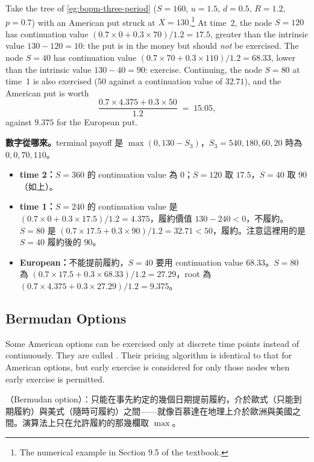 \begin{eg}
	\label{eg:american-put}
	Take the tree of \autoref{eg:bopm-three-period} ($S=160$, $u=1.5$, $d=0.5$, $R=1.2$, $p=0.7$) with an American put struck at $X=130$.\footnote{The numerical example in Section 9.5 of the textbook.}
	At time~2, the node $S=120$ has continuation value $(0.7\times0+0.3\times70)/1.2=17.5$, greater than the intrinsic value $130-120=10$: the put is in the money but should \emph{not} be exercised.
	The node $S=40$ has continuation value $(0.7\times70+0.3\times110)/1.2=68.33$, lower than the intrinsic value $130-40=90$: exercise.
	Continuing, the node $S=80$ at time~1 is also exercised ($50$ against a continuation value of $32.71$), and the American put is worth
	\[
		\frac{0.7\times4.375+0.3\times50}{1.2} \;=\; 15.05 ,
	\]
	against $9.375$ for the European put.

\begin{remark}
	\textbf{數字從哪來。}terminal payoff 是 $\max(0,130-S_{3})$，$S_{3}=540,180,60,20$ 時為 $0,0,70,110$。
	\begin{itemize}[nosep]
		\item \textbf{time 2：}$S=360$ 的 continuation value 為 $0$；$S=120$ 取 $17.5$，$S=40$ 取 $90$（如上）。
		\item \textbf{time 1：}$S=240$ 的 continuation value 是 $(0.7\times0+0.3\times17.5)/1.2=4.375$，履約價值 $130-240<0$，不履約。$S=80$ 是 $(0.7\times17.5+0.3\times90)/1.2=32.71<50$，履約。注意這裡用的是 $S=40$ 履約後的 $90$。
		\item \textbf{European：}不能提前履約，$S=40$ 要用 continuation value $68.33$。$S=80$ 為 $(0.7\times17.5+0.3\times68.33)/1.2=27.29$，root 為 $(0.7\times4.375+0.3\times27.29)/1.2=9.375$。
	\end{itemize}
\end{remark}
\end{eg}
\suppend

\subsection{Bermudan Options}


Some American options can be exercised only at discrete time points instead of continuously.
They are called .
Their pricing algorithm is identical to that for American options, but early exercise is considered for only those nodes when early exercise is permitted.

\suppstart
\begin{remark}
	（Bermudan option）：只能在事先約定的幾個日期提前履約，介於歐式（只能到期履約）與美式（隨時可履約）之間——就像百慕達在地理上介於歐洲與美國之間。演算法上只在允許履約的那幾欄取 $\max$。
\end{remark}
\suppend

